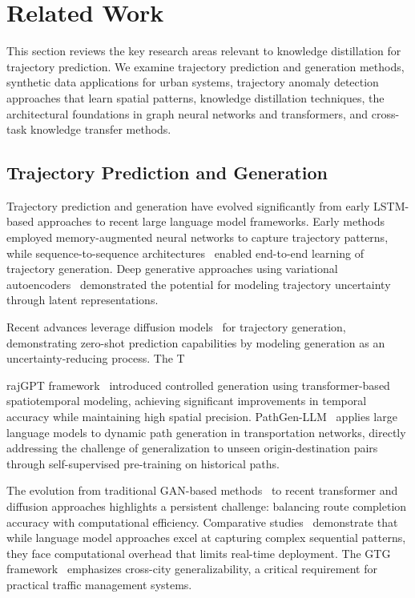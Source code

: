 \section{Related Work}
\label{sec:lit-review}

This section reviews the key research areas relevant to knowledge distillation for trajectory prediction. We examine trajectory prediction and generation methods, synthetic data applications for urban systems, trajectory anomaly detection approaches that learn spatial patterns, knowledge distillation techniques, the architectural foundations in graph neural networks and transformers, and cross-task knowledge transfer methods.

\subsection{Trajectory Prediction and Generation}
\label{sec:lit-traj-pred}

Trajectory prediction and generation have evolved significantly from early LSTM-based approaches to recent large language model frameworks. Early methods~\cite{liangMemoryAugmentedNeural2018} employed memory-augmented neural networks to capture trajectory patterns, while sequence-to-sequence architectures~\cite{chenSeq2SeqTrajectoryGeneration2020} enabled end-to-end learning of trajectory generation. Deep generative approaches using variational autoencoders~\cite{liuOnlineAnomalousTrajectory2020} demonstrated the potential for modeling trajectory uncertainty through latent representations.

Recent advances leverage diffusion models~\cite{chuSimulatingHumanMobility2024} for trajectory generation, demonstrating zero-shot prediction capabilities by modeling generation as an uncertainty-reducing process. The T

rajGPT framework~\cite{hsuTrajGPTControlledSynthetic2024} introduced controlled generation using transformer-based spatiotemporal modeling, achieving significant improvements in temporal accuracy while maintaining high spatial precision. PathGen-LLM~\cite{liPathGenLLMLargeLanguage} applies large language models to dynamic path generation in transportation networks, directly addressing the challenge of generalization to unseen origin-destination pairs through self-supervised pre-training on historical paths.

The evolution from traditional GAN-based methods~\cite{raoLSTMTrajGANDeepLearning20} to recent transformer and diffusion approaches highlights a persistent challenge: balancing route completion accuracy with computational efficiency. Comparative studies~\cite{zhangEndtoendTrajectoryGeneration2025} demonstrate that while language model approaches excel at capturing complex sequential patterns, they face computational overhead that limits real-time deployment. The GTG framework~\cite{guoGTGGeneralizableTrajectory} emphasizes cross-city generalizability, a critical requirement for practical traffic management systems.

